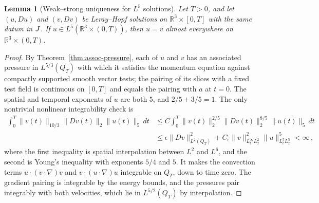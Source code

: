 \documentclass[11pt,letterpaper]{article}
\numberwithin{equation}{section}
\theoremstyle{plain}
\newtheorem{lemma}[theorem]{Lemma}
\theoremstyle{definition}
\theoremstyle{remark}
\begin{document}
\begin{lemma}[Weak--strong uniqueness for $L^5$ solutions]\label{lem:pv-serrin-uniqueness}
Let $T>0$, and let $(u,Du)$ and $(v,Dv)$ be Leray--Hopf solutions on $\mathbb R^3\times[0,T]$ with the same datum in $J$. If $u\in L^5(\mathbb R^3\times(0,T))$, then $u=v$ almost everywhere on $\mathbb R^3\times(0,T)$.
\end{lemma}

\begin{proof}
By Theorem~\ref{thm:assoc-pressure}, each of $u$ and $v$ has an associated pressure in $L^{5/3}(Q_T)$ with which it satisfies the momentum equation against compactly supported smooth vector tests; the pairing of its slices with a fixed test field is continuous on $[0,T]$ and equals the pairing with $a$ at $t=0$. The spatial and temporal exponents of $u$ are both $5$, and $2/5+3/5=1$. The only nontrivial nonlinear integrability check is
\begin{align*}
\int_0^T\|v(t)\|_{10/3}\|Dv(t)\|_2\|u(t)\|_5\,dt
 &\le C\int_0^T\|v(t)\|_2^{2/5}\|Dv(t)\|_2^{8/5}\|u(t)\|_5\,dt\\
 &\le \epsilon\|Dv\|_{L^2(Q_T)}^2+C_\epsilon\|v\|_{L^\infty_tL^2_x}^2\|u\|_{L^5_tL^5_x}^5<\infty\,,
\end{align*}
where the first inequality is spatial interpolation between $L^2$ and $L^6$, and the second is Young's inequality with exponents $5/4$ and $5$. It makes the convection terms $u\cdot(v\cdot\nabla)v$ and $v\cdot(u\cdot\nabla)u$ integrable on $Q_T$, down to time zero. The gradient pairing is integrable by the energy bounds, and the pressures pair integrably with both velocities, which lie in $L^{5/2}(Q_T)$ by interpolation.


\end{proof}
\end{document}
